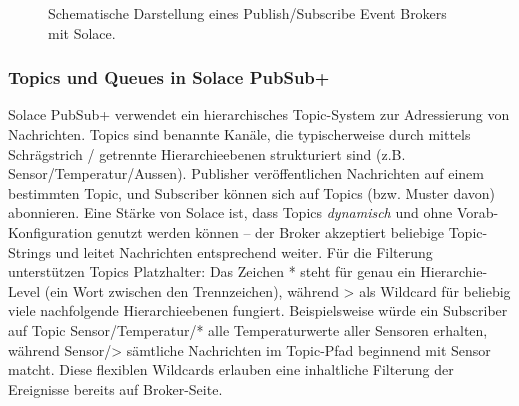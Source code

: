 \begin{figure}[h]
\centering
{}
\caption{Schematische Darstellung eines Publish/Subscribe Event Brokers mit Solace.}
\label{fig:broker-arch}
\end{figure}

\subsubsection{Topics und Queues in Solace PubSub+}

Solace PubSub+ verwendet ein hierarchisches Topic-System zur Adressierung von Nachrichten. Topics sind benannte Kanäle, die typischerweise durch mittels Schrägstrich / getrennte Hierarchieebenen strukturiert sind (z.B. Sensor/Temperatur/Aussen). Publisher veröffentlichen Nachrichten auf einem bestimmten Topic, und Subscriber können sich auf Topics (bzw. Muster davon) abonnieren. Eine Stärke von Solace ist, dass Topics \textit{dynamisch} und ohne Vorab-Konfiguration genutzt werden können – der Broker akzeptiert beliebige Topic-Strings und leitet Nachrichten entsprechend weiter. Für die Filterung unterstützen Topics Platzhalter: Das Zeichen * steht für genau ein Hierarchie-Level (ein Wort zwischen den Trennzeichen), während > als Wildcard für beliebig viele nachfolgende Hierarchieebenen fungiert. Beispielsweise würde ein Subscriber auf Topic Sensor/Temperatur/* alle Temperaturwerte aller Sensoren erhalten, während Sensor/> sämtliche Nachrichten im Topic-Pfad beginnend mit Sensor matcht. Diese flexiblen Wildcards erlauben eine inhaltliche Filterung der Ereignisse bereits auf Broker-Seite.

